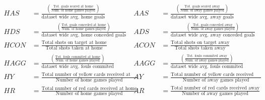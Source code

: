 \documentclass[a4paper,12pt]{article}
\begin{document}
	
	\begin{align*}
			HAS&=\frac{\left(\frac{\text{Tot. goals scored at home}}{\text{Num. of home games played}}\right)}{\text{dataset wide avg. home goals}}           &  
			AAS&=\frac{\left(\frac{\text{Tot. goals scored away}}{\text{Num. of away games played}}\right)}{\text{dataset wide avg. away goals}}           \\
			HDS&=\frac{\left(\frac{\text{Tot. goals conceded at home}}{\text{Num. of home games played}}\right)}{\text{dataset wide avg. home conceded goals}}           &  
			ADS&=\frac{\left(\frac{\text{Tot. goals conceded away}}{\text{Num. of away games played}}\right)}{\text{dataset wide avg. away conceded goals}}           \\
			HCON&=\frac{\text{Total shots on target at home}}{\text{Total shots taken at home}}           &  
			ACON&=\frac{\text{Total shots on target away}}{\text{Total shots taken away}}           \\
			HAGG&=\frac{\left(\frac{\text{Tot. fouls commited at home}}{\text{Num. of home games played}}\right)}{\text{dataset wide avg. fouls commited}}           &  
			AAGG&=\frac{\left(\frac{\text{Tot. fouls commited away}}{\text{Num. of away games played}}\right)}{\text{dataset wide avg. fouls commited}}           \\
			HY&=\frac{\text{Total number of yellow cards received at home}}{\text{Number of home games played}}           &  
			AY&=\frac{\text{Total number of yellow cards received away}}{\text{Number of away games played}}           \\
			HR&=\frac{\text{Total number of red cards received at home}}{\text{Number of home games played}}           &  
			AR&=\frac{\text{Total number of red cards received away}}{\text{Number of away games played}}          \\
	\end{align*}
	
\end{document}
